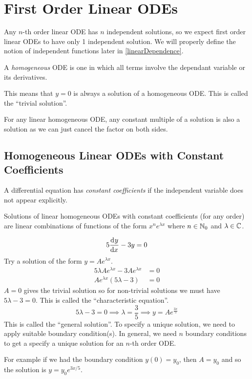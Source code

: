 \documentclass[../main.tex]{subfiles}
\begin{document}
\section{First Order Linear ODEs}
\begin{remark}
  Any $n$-th order linear ODE has $n$ independent solutions, so we expect first order linear ODEs to have only 1 independent solution.
  We will properly define the notion of independent functions later in \cref{linearDependence}.
\end{remark}
\begin{definition}[Homogeneous]
  A \textit{homogeneous} ODE is one in which all terms involve the dependant variable or its derivatives.
\end{definition}
This means that $y = 0$ is always a solution of a homogeneous ODE.
This is called the ``trivial solution''.
\begin{remark}
  For any linear homogeneous ODE, any constant multiple of a solution is also a solution as we can just cancel the factor on both sides.
\end{remark}
\subsection{Homogeneous Linear ODEs with Constant Coefficients}
\begin{definition}
  A differential equation has \textit{constant coefficients} if the independent variable does not appear explicitly.
\end{definition}

Solutions of linear homogeneous ODEs with constant coefficients (for any order) are linear combinations of functions of the form $x^{n}e^{\lambda x}$ where $n \in \mathbb{N}_0$ and $\lambda \in \mathbb{C}$.
\begin{example}
  \[
    5\deriv{y}{x} - 3y = 0
  \]
  Try a solution of the form $y = Ae^{\lambda x}$.
  \begin{align*}
    5\lambda Ae^{\lambda x} - 3Ae^{\lambda x} &= 0 \\
    Ae^{\lambda x}(5\lambda - 3) &= 0
  \end{align*}
  $A= 0$ gives the trivial solution so for non-trivial solutions we must have $5\lambda - 3 = 0$.
  This is called the ``characteristic equation''.
  \[
    5\lambda - 3 = 0 \implies \lambda = \frac{3}{5} \implies y = Ae^{\frac{3x}{5}}
  \]
  This is called the ``general solution''.
  To specify a unique solution, we need to apply suitable boundary condition(s).
  In general, we need $n$ boundary conditions to get a specify a unique solution for an $n$-th order ODE.

  For example if we had the boundary condition $y(0) = y_0$, then $A = y_0$ and so the solution is $y = y_0 e^{3x/5}$.
\end{example}
\end{document}
